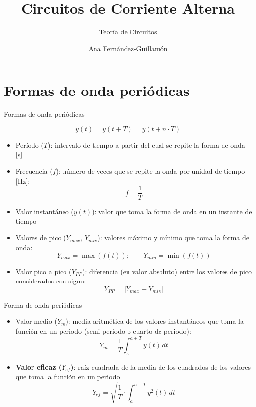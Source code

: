 \documentclass[aspectratio=169, xcolor={usenames,svgnames,dvipsnames}]{beamer}
\author{Ana Fernández-Guillamón}
\date{}
\title{Circuitos de Corriente Alterna}
\subtitle{Teoría de Circuitos}
\begin{document}
\maketitle

\section{Formas de onda periódicas}

\begin{frame}{Formas de onda periódicas}

\begin{equation*}
    y(t)=y(t+T)=y(t+n\cdot T)
\end{equation*}

\begin{itemize}
		\item \alert{Período ($T$)}: intervalo de tiempo a partir del cual se repite la forma de onda [s]
		\item \alert{Frecuencia ($f$)}: número de veces que se repite la onda por unidad de tiempo [Hz]:
		\begin{equation*}
			f = \dfrac{1}{T}
		\end{equation*}
		\item \alert{Valor instantáneo ($y(t)$)}: valor que toma la forma de onda en un instante de tiempo 
		\item \alert{Valores de pico ($Y_{max}$, $Y_{min}$)}: valores máximo y mínimo que toma la forma de onda:
		\begin{equation*}
			Y_{max} = \max(f(t)); \qquad Y_{min} = \min(f(t))
		\end{equation*}
		\item \alert{Valor pico a pico ($Y_{PP}$)}: diferencia (en valor absoluto) entre los valores de pico considerados con signo: 
		\begin{equation*}
			Y_{PP}=|Y_{max} - Y_{min}|
		\end{equation*}
		\end{itemize}
		\end{frame}
		
		\begin{frame}{Forma de onda periódicas}
		\begin{itemize}
		\item \alert{Valor medio ($Y_m$)}: media aritmética de los valores instantáneos que toma la función en un periodo (semi-periodo o cuarto de periodo): 
		\begin{equation*}
			\boxed{Y_m=\frac{1}{T}\int_{a}^{a+T}y(t)\, dt}
		\end{equation*}
		\item \textbf{Valor eficaz ($Y_{ef}$)}: raíz cuadrada de la media de los cuadrados de los valores que toma la función en un periodo
		\begin{equation*}
			\boxed{Y_{ef} = \sqrt{\frac{1}{T}\cdot\int_{a}^{a+T}y^{2}(t)\, dt}}
		\end{equation*}
	\end{itemize}
\end{frame}
\end{document}
